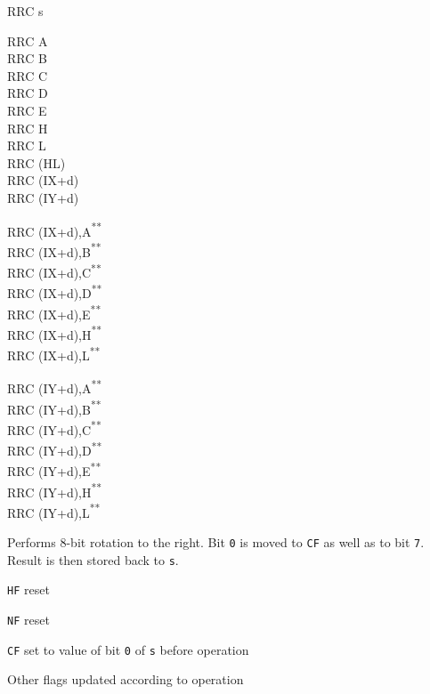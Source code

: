 \documentclass[twoside,openright,a4paper]{book}
\newcommand{\UNDOC}{\textnormal{\textsuperscript{**}}}
\begin{document}
\begin{basedescript}{
	\desclabelstyle{\multilinelabel}
	\desclabelwidth{3cm}}
\begin{detailitem}{RRC s}
		\begin{DetailVariants}
			RRC A\\
			RRC B\\
			RRC C\\
			RRC D\\
			RRC E\\
			RRC H\\
			RRC L\\
			RRC (HL)\\
			RRC (IX+d)\\
			RRC (IY+d)

			\columnbreak
			RRC (IX+d),A\UNDOC\\
			RRC (IX+d),B\UNDOC\\
			RRC (IX+d),C\UNDOC\\
			RRC (IX+d),D\UNDOC\\
			RRC (IX+d),E\UNDOC\\
			RRC (IX+d),H\UNDOC\\
			RRC (IX+d),L\UNDOC

			\columnbreak
			RRC (IY+d),A\UNDOC\\
			RRC (IY+d),B\UNDOC\\
			RRC (IY+d),C\UNDOC\\
			RRC (IY+d),D\UNDOC\\
			RRC (IY+d),E\UNDOC\\
			RRC (IY+d),H\UNDOC\\
			RRC (IY+d),L\UNDOC
		\end{DetailVariants}

		Performs 8-bit rotation to the right. Bit {\tt 0} is moved to {\tt CF} as well as to bit {\tt 7}. Result is then stored back to {\tt s}.

		\begin{DetailEffects}
			\item {\tt HF} reset
			\item {\tt NF} reset
			\item {\tt CF} set to value of bit {\tt 0} of {\tt s} before operation
			\item Other flags updated according to operation
		\end{DetailEffects}
						
		\begin{DetailTiming}
		\end{DetailTiming}

	\end{detailitem}


\end{basedescript}
\end{document}
